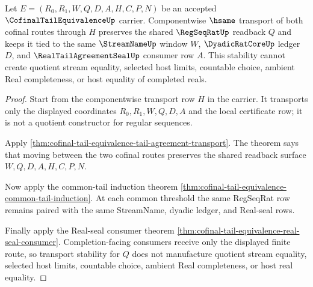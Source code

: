 \begin{theorem}
\label{thm:cofinal-tail-equivalence-regseqrat-stability}
Let $E=(R_0,R_1,W,Q,D,A,H,C,P,N)$ be an accepted $\CofinalTailEquivalenceUp$ carrier. Componentwise $\hsame$ transport of both cofinal routes through $H$ preserves the shared $\RegSeqRatUp$ readback $Q$ and keeps it tied to the same $\StreamNameUp$ window $W$, $\DyadicRatCoreUp$ ledger $D$, and $\RealTailAgreementSealUp$ consumer row $A$. This stability cannot create quotient stream equality, selected host limits, countable choice, ambient Real completeness, or host equality of completed reals.
\end{theorem}
\begin{proof}
Start from the componentwise transport row $H$ in the carrier. It transports only the displayed coordinates $R_0,R_1,W,Q,D,A$ and the local certificate row; it is not a quotient constructor for regular sequences.

Apply \autoref{thm:cofinal-tail-equivalence-tail-agreement-transport}. The theorem says that moving between the two cofinal routes preserves the shared readback surface $W,Q,D,A,H,C,P,N$.

Now apply the common-tail induction theorem \autoref{thm:cofinal-tail-equivalence-common-tail-induction}. At each common threshold the same RegSeqRat row remains paired with the same StreamName, dyadic ledger, and Real-seal rows.

Finally apply the Real-seal consumer theorem \autoref{thm:cofinal-tail-equivalence-real-seal-consumer}. Completion-facing consumers receive only the displayed finite route, so transport stability for $Q$ does not manufacture quotient stream equality, selected host limits, countable choice, ambient Real completeness, or host real equality.
\end{proof}

